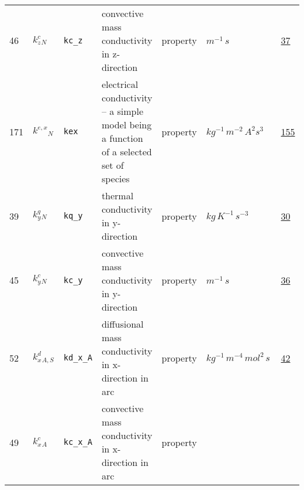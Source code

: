 \begin{longtable}{|p{1cm}|p{2.5cm}|p{4.5cm}|p{8cm}|p{3.0cm}|p{3cm}|p{1cm}|}
                 \\
            46
             & \hypertarget{"v:46"}{ $ {{k^c_z}}{_{N}} $}
             & \verb|kc_z|
             &  convective mass conductivity in z-direction
             & \begin{lay}property \end{lay}
             & $ m^{-1} \,s \, $
             &                 \hyperlink{"e:37"}{ 37 }
                 \\
            171
             & \hypertarget{"v:171"}{ $ {{k^{e,x}}}{_{N}} $}
             & \verb|kex|
             & electrical conductivity -- a simple model being a function of a selected set of species
             & \begin{lay}property \end{lay}
             & $ kg^{-1} \,m^{-2} \,A^{2} s^{3} \, $
             &                 \hyperlink{"e:155"}{ 155 }
                 \\
            39
             & \hypertarget{"v:39"}{ $ {{k^q_y}}{_{N}} $}
             & \verb|kq_y|
             & thermal conductivity in y-direction
             & \begin{lay}property \end{lay}
             & $ kg \,K^{-1} \,s^{-3} \, $
             &                 \hyperlink{"e:30"}{ 30 }
                 \\
            45
             & \hypertarget{"v:45"}{ $ {{k^c_y}}{_{N}} $}
             & \verb|kc_y|
             &  convective mass conductivity in y-direction
             & \begin{lay}property \end{lay}
             & $ m^{-1} \,s \, $
             &                 \hyperlink{"e:36"}{ 36 }
                 \\
            52
             & \hypertarget{"v:52"}{ $ {{k^d_x}}{_{A, S}} $}
             & \verb|kd_x_A|
             & diffusional mass conductivity in x-direction in arc
             & \begin{lay}property \end{lay}
             & $ kg^{-1} \,m^{-4} \,mol^{2} \,s \, $
             &                 \hyperlink{"e:42"}{ 42 }
                 \\
            49
             & \hypertarget{"v:49"}{ $ {{k^c_x}}{_{A}} $}
             & \verb|kc_x_A|
             &  convective mass conductivity in x-direction in arc
             & \begin{lay}property \end{lay}

\end{longtable}

